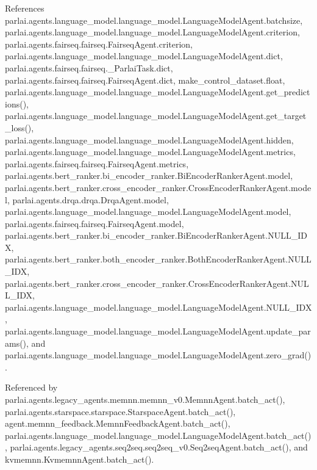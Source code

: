 References parlai.\+agents.\+language\+\_\+model.\+language\+\_\+model.\+Language\+Model\+Agent.\+batchsize, parlai.\+agents.\+language\+\_\+model.\+language\+\_\+model.\+Language\+Model\+Agent.\+criterion, parlai.\+agents.\+fairseq.\+fairseq.\+Fairseq\+Agent.\+criterion, parlai.\+agents.\+language\+\_\+model.\+language\+\_\+model.\+Language\+Model\+Agent.\+dict, parlai.\+agents.\+fairseq.\+fairseq.\+\_\+\+Parlai\+Task.\+dict, parlai.\+agents.\+fairseq.\+fairseq.\+Fairseq\+Agent.\+dict, make\+\_\+control\+\_\+dataset.\+float, parlai.\+agents.\+language\+\_\+model.\+language\+\_\+model.\+Language\+Model\+Agent.\+get\+\_\+predictions(), parlai.\+agents.\+language\+\_\+model.\+language\+\_\+model.\+Language\+Model\+Agent.\+get\+\_\+target\+\_\+loss(), parlai.\+agents.\+language\+\_\+model.\+language\+\_\+model.\+Language\+Model\+Agent.\+hidden, parlai.\+agents.\+language\+\_\+model.\+language\+\_\+model.\+Language\+Model\+Agent.\+metrics, parlai.\+agents.\+fairseq.\+fairseq.\+Fairseq\+Agent.\+metrics, parlai.\+agents.\+bert\+\_\+ranker.\+bi\+\_\+encoder\+\_\+ranker.\+Bi\+Encoder\+Ranker\+Agent.\+model, parlai.\+agents.\+bert\+\_\+ranker.\+cross\+\_\+encoder\+\_\+ranker.\+Cross\+Encoder\+Ranker\+Agent.\+model, parlai.\+agents.\+drqa.\+drqa.\+Drqa\+Agent.\+model, parlai.\+agents.\+language\+\_\+model.\+language\+\_\+model.\+Language\+Model\+Agent.\+model, parlai.\+agents.\+fairseq.\+fairseq.\+Fairseq\+Agent.\+model, parlai.\+agents.\+bert\+\_\+ranker.\+bi\+\_\+encoder\+\_\+ranker.\+Bi\+Encoder\+Ranker\+Agent.\+N\+U\+L\+L\+\_\+\+I\+DX, parlai.\+agents.\+bert\+\_\+ranker.\+both\+\_\+encoder\+\_\+ranker.\+Both\+Encoder\+Ranker\+Agent.\+N\+U\+L\+L\+\_\+\+I\+DX, parlai.\+agents.\+bert\+\_\+ranker.\+cross\+\_\+encoder\+\_\+ranker.\+Cross\+Encoder\+Ranker\+Agent.\+N\+U\+L\+L\+\_\+\+I\+DX, parlai.\+agents.\+language\+\_\+model.\+language\+\_\+model.\+Language\+Model\+Agent.\+N\+U\+L\+L\+\_\+\+I\+DX, parlai.\+agents.\+language\+\_\+model.\+language\+\_\+model.\+Language\+Model\+Agent.\+update\+\_\+params(), and parlai.\+agents.\+language\+\_\+model.\+language\+\_\+model.\+Language\+Model\+Agent.\+zero\+\_\+grad().



Referenced by parlai.\+agents.\+legacy\+\_\+agents.\+memnn.\+memnn\+\_\+v0.\+Memnn\+Agent.\+batch\+\_\+act(), parlai.\+agents.\+starspace.\+starspace.\+Starspace\+Agent.\+batch\+\_\+act(), agent.\+memnn\+\_\+feedback.\+Memnn\+Feedback\+Agent.\+batch\+\_\+act(), parlai.\+agents.\+language\+\_\+model.\+language\+\_\+model.\+Language\+Model\+Agent.\+batch\+\_\+act(), parlai.\+agents.\+legacy\+\_\+agents.\+seq2seq.\+seq2seq\+\_\+v0.\+Seq2seq\+Agent.\+batch\+\_\+act(), and kvmemnn.\+Kvmemnn\+Agent.\+batch\+\_\+act().

